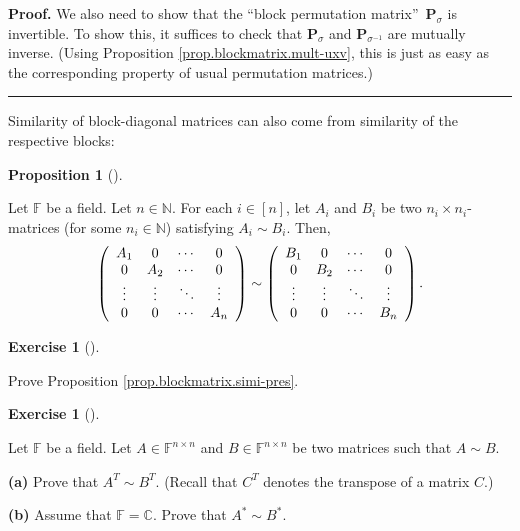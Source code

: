 \documentclass[numbers=enddot,12pt,final,onecolumn,notitlepage]{scrartcl}%
\newcounter{exer}
\numberwithin{exer}{subsection}
\theoremstyle{definition}
\newtheorem{prop}[theo]{Proposition}
\newenvironment{proposition}[1][]
{\begin{prop}[#1]\begin{leftbar}}
{\end{leftbar}\end{prop}}
\newtheorem{exmp}[exer]{Exercise}
\newenvironment{exercise}[1][]
{\begin{exmp}[#1]\begin{leftbar}}
{\end{leftbar}\end{exmp}}
\newenvironment{proof}[1][Proof]{\noindent\textbf{#1.} }{\ \rule{0.5em}{0.5em}}
\begin{document}
\begin{proof}
We also need to show that the \textquotedblleft block permutation
matrix\textquotedblright\ $\mathbf{P}_{\sigma}$ is invertible. To show this,
it suffices to check that $\mathbf{P}_{\sigma}$ and $\mathbf{P}_{\sigma^{-1}}$
are mutually inverse. (Using Proposition \ref{prop.blockmatrix.mult-uxv}, this
is just as easy as the corresponding property of usual permutation matrices.)
\end{proof}

Similarity of block-diagonal matrices can also come from similarity of the
respective blocks:

\begin{proposition}
\label{prop.blockmatrix.simi-pres}Let $\mathbb{F}$ be a field. Let
$n\in\mathbb{N}$. For each $i\in\left[  n\right]  $, let $A_{i}$ and $B_{i}$
be two $n_{i}\times n_{i}$-matrices (for some $n_{i}\in\mathbb{N}$) satisfying
$A_{i}\sim B_{i}$. Then,%
\[
\left(
\begin{array}
[c]{cccc}%
A_{1} & 0 & \cdots & 0\\
0 & A_{2} & \cdots & 0\\
\vdots & \vdots & \ddots & \vdots\\
0 & 0 & \cdots & A_{n}%
\end{array}
\right)  \sim\left(
\begin{array}
[c]{cccc}%
B_{1} & 0 & \cdots & 0\\
0 & B_{2} & \cdots & 0\\
\vdots & \vdots & \ddots & \vdots\\
0 & 0 & \cdots & B_{n}%
\end{array}
\right)  .
\]

\end{proposition}

\begin{exercise}
\label{exe.blockmatrix.simi-pres} Prove Proposition
\ref{prop.blockmatrix.simi-pres}.
\end{exercise}

\begin{exercise}
 Let $\mathbb{F}$ be a field. Let $A\in\mathbb{F}^{n\times n}$ and
$B\in\mathbb{F}^{n\times n}$ be two matrices such that $A\sim B$. \medskip

\textbf{(a)} Prove that $A^{T}\sim B^{T}$. (Recall that $C^{T}$ denotes the
transpose of a matrix $C$.) \medskip

\textbf{(b)} Assume that $\mathbb{F}=\mathbb{C}$. Prove that $A^{\ast}\sim
B^{\ast}$.
\end{exercise}
\end{document}
